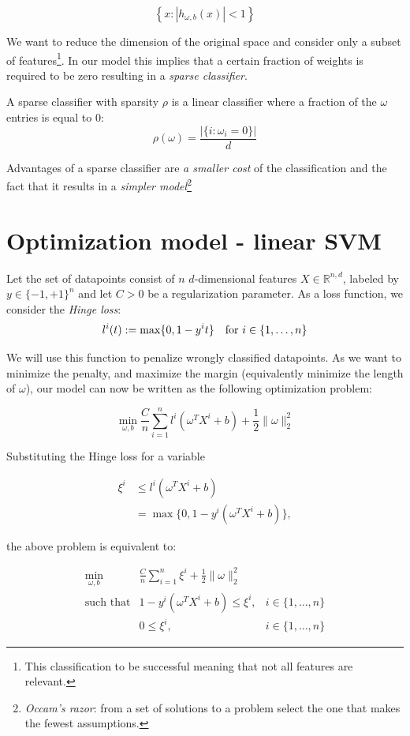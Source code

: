 \documentclass[11pt]{article}
\newcommand\abs[1]{\left|#1\right|}
\newcommand{\R}{\mathbb{R}}
\begin{document}
$$ \left\{ x : \abs{h_{\omega,b} (x)} < 1 \right\} $$

We want to reduce the dimension of the original space and consider only a subset of features\footnote{
  This classification to be successful meaning that not all features are relevant.}.
In our model this implies that a certain fraction of weights is required to be zero resulting in a \emph{sparse classifier}.


A sparse classifier with sparsity $\rho$ is a linear classifier where a fraction of the $\omega$ entries is equal to 0:
$$ \rho(\omega) = \frac{\abs{\{ i \colon \omega_{i} = 0 \}}}{d} $$

Advantages of a sparse classifier are \emph{a smaller cost} of the classification and the fact that it results in a \emph{simpler model}\footnote{\emph{Occam's razor}: from a set of solutions to a problem select the one that makes the fewest assumptions.}


\clearpage
\section*{Optimization model - linear SVM}

Let the set of datapoints consist of $n$ $d$-dimensional features $X \in \R^{n,d}$, labeled by $y \in \{-1,+1\}^{n}$ and let $C > 0$ be a regularization parameter.
As a loss function, we consider the \emph{Hinge loss}:
$$l^{i}(t) :=  \max \{0, 1 - y^i t\} \text{\quad for } i \in \{1,\dots, n\}$$

We will use this function to penalize wrongly classified datapoints.
As we want to minimize the penalty, and maximize the margin (equivalently minimize the length of $\omega$), our model can now be written as the following optimization problem:

$$
\min\limits_{\omega, b}
\frac{C}{n} \sum\limits_{i = 1}^{n} l^i(\omega^{T}X^{i} + b)
+\frac{1}{2} \lVert \omega \rVert_{2}^{2}
$$

Substituting the Hinge loss for a variable

$$ \begin{aligned}
\xi^i &\leq l^i( \omega^T X^i + b ) \\
&= \max \{0, 1 - y^i (\omega^TX^i + b) \},
\end{aligned} $$

the above problem is equivalent to:

\begin{equation*}
\begin{array}{rll}
  \min\limits_{\omega, b}
  & \frac{C}{n} \sum\limits_{i = 1}^n \xi^i + \frac{1}{2} \lVert \omega \rVert_2^2
\\
  \text{such that}
  & 1 - y^i (\omega^T X^i +b) \leq \xi^i,
  & i \in \{1,\dots,n\}
\\
  & 0 \leq \xi^i,
  & i \in \{1,\dots, n\}
\end{array}
\end{equation*}
\end{document}
